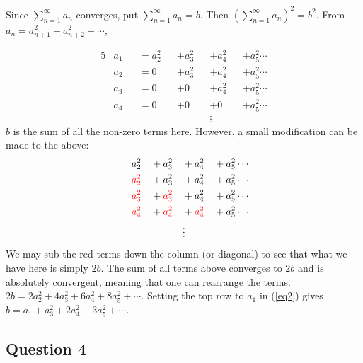 \documentclass{article}
\begin{document}
Since $\sum_{n=1}^\infty a_n$ converges, put $\sum_{n=1}^\infty a_n=b$. Then $(\sum_{n=1}^\infty a_n)^2=b^2$. From $a_n = a_{n+1}^2 + a_{n+2}^2 + \cdots$, 

\begin{alignat}{5} \nonumber
  &a_1&&= a_2^2 &&+ a_3^2 &&+ a_4^2 &&+ a_5^2  \cdots  \\ \label{eq2}
  &a_2&&= 0 &&+ a_3^2 &&+ a_4^2 &&+ a_5^2\cdots \\ \nonumber
  &a_3&&= 0 &&+ 0 &&+ a_4^2 &&+ a_5^2\cdots \\ \nonumber
  &a_4&&= 0 &&+ 0 &&+ 0 &&+ a_5^2\cdots \\ \nonumber
  & \ && \ && \ && \vdots && \  \nonumber
\end{alignat}
$b$ is the sum of all the non-zero terms here. However, a small modification can be made to the above: 
\begin{alignat*}{5}
  & && a_2^2 &&+ a_3^2 &&+ a_4^2 &&+ a_5^2  \cdots  \\
  & && \textcolor{red}{a_2^2} &&+ a_3^2 &&+ a_4^2 &&+ a_5^2\cdots \\
  & && \textcolor{red}{a_3^2} &&+ \textcolor{red}{a_3^2} &&+ a_4^2 &&+ a_5^2\cdots \\
  & && \textcolor{red}{a_4^2} &&+ \textcolor{red}{a_4^2} &&+ \textcolor{red}{a_4^2} &&+ a_5^2\cdots \\
  & \ && \ && \ && \vdots && \ 
\end{alignat*}
We may sub the red terms down the column (or diagonal) to see that what we have here is simply $2b$. The sum of all terms above converges to $2b$ and is absolutely convergent, meaning that one can rearrange the terms. $2b=2a_2^2 + 4a_3^2 + 6a_4^2 + 8a_5^2 + \cdots$. Setting the top row to $a_1$ in (\ref{eq2}) gives $b=a_1 + a_3^2 + 2a_4^2 + 3a_5^2+\cdots$.

\subsection*{Question 4}
\end{document}
